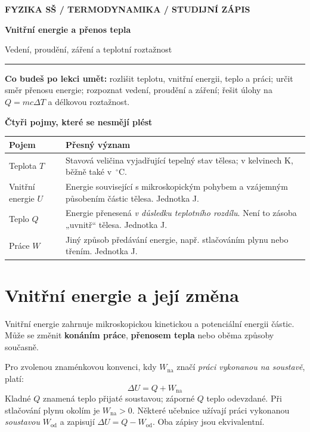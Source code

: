 \documentclass[11pt,a4paper]{article}
\begin{document}
{\color{VSBlue}\footnotesize\bfseries FYZIKA SŠ \quad / \quad TERMODYNAMIKA \quad / \quad STUDIJNÍ ZÁPIS}\par
\vspace{4mm}
{\Huge\bfseries\color{VSNavy}Vnitřní energie a přenos tepla}\par
{\Large\color{VSBlue}Vedení, proudění, záření a teplotní roztažnost}\par
\vspace{3mm}
{\color{VSGrey}\rule{\linewidth}{.6pt}}\par
\vspace{2mm}
\textbf{Co budeš po lekci umět:} rozlišit teplotu, vnitřní energii, teplo a práci; určit směr přenosu energie; rozpoznat vedení, proudění a záření; řešit úlohy na $Q=mc\Delta T$ a délkovou roztažnost.

\begin{theorybox}
\textbf{Čtyři pojmy, které se nesmějí plést}

\begin{tabular}{@{}p{.18\linewidth}p{.76\linewidth}@{}}
\toprule
\textbf{Pojem} & \textbf{Přesný význam} \\
\midrule
Teplota $T$ & Stavová veličina vyjadřující tepelný stav tělesa; v kelvinech K, běžně také v \,$^\circ$C.\\
Vnitřní energie $U$ & Energie související s mikroskopickým pohybem a vzájemným působením částic tělesa. Jednotka J.\\
Teplo $Q$ & Energie přenesená \emph{v důsledku teplotního rozdílu}. Není to zásoba „uvnitř“ tělesa. Jednotka J.\\
Práce $W$ & Jiný způsob předávání energie, např. stlačováním plynu nebo třením. Jednotka J.\\
\bottomrule
\end{tabular}
\end{theorybox}

\section{Vnitřní energie a její změna}
Vnitřní energie zahrnuje mikroskopickou kinetickou a potenciální energii částic. Může se změnit \textbf{konáním práce}, \textbf{přenosem tepla} nebo oběma způsoby současně.

Pro zvolenou znaménkovou konvenci, kdy $W_{\mathrm{na}}$ značí \emph{práci vykonanou na soustavě}, platí:
\[
\boxed{\Delta U=Q+W_{\mathrm{na}}}
\]
Kladné $Q$ znamená teplo přijaté soustavou; záporné $Q$ teplo odevzdané. Při stlačování plynu okolím je $W_{\mathrm{na}}>0$.
Některé učebnice užívají práci vykonanou \emph{soustavou} $W_{\mathrm{od}}$ a zapisují $\Delta U=Q-W_{\mathrm{od}}$. Oba zápisy jsou ekvivalentní.
\end{document}
